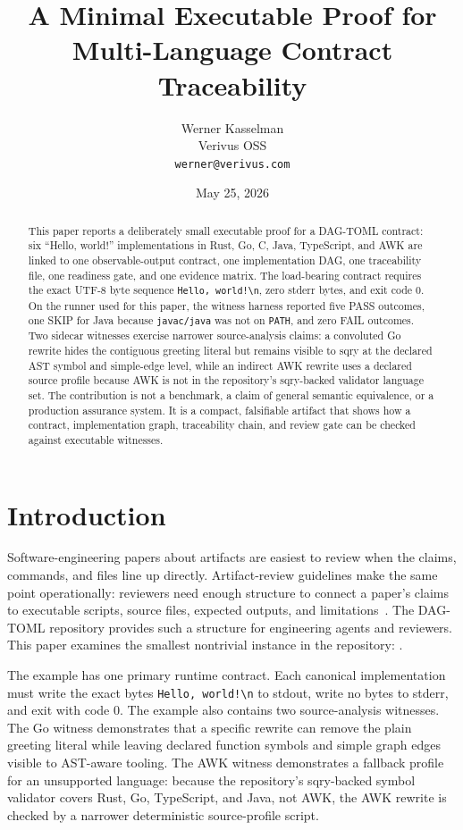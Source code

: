 \documentclass[11pt,letterpaper]{article}
\title{\bfseries A Minimal Executable Proof for Multi-Language Contract Traceability}
\author{Werner Kasselman\\Verivus OSS\\\texttt{werner@verivus.com}}
\date{May 25, 2026}
\newcommand{\dagtoml}{DAG-TOML}
\newcommand{\hellobytes}{\texttt{Hello, world!\textbackslash n}}
\begin{document}
\maketitle

\begin{abstract}
This paper reports a deliberately small executable proof for a
\dagtoml{} contract: six ``Hello, world!'' implementations in Rust, Go,
C, Java, TypeScript, and AWK are linked to one observable-output
contract, one implementation DAG, one traceability file, one readiness
gate, and one evidence matrix. The load-bearing contract requires the
exact UTF-8 byte sequence \hellobytes{}, zero stderr bytes, and exit
code 0. On the runner used for this paper, the witness harness reported
five PASS outcomes, one SKIP for Java because \texttt{javac/java} was
not on \texttt{PATH}, and zero FAIL outcomes. Two sidecar witnesses
exercise narrower source-analysis claims: a convoluted Go rewrite hides
the contiguous greeting literal but remains visible to sqry at the
declared AST symbol and simple-edge level, while an indirect AWK
rewrite uses a declared source profile because AWK is not in the
repository's sqry-backed validator language set. The contribution is
not a benchmark, a claim of general semantic equivalence, or a
production assurance system. It is a compact, falsifiable artifact that
shows how a contract, implementation graph, traceability chain, and
review gate can be checked against executable witnesses.
\end{abstract}

\section{Introduction}

Software-engineering papers about artifacts are easiest to review when
the claims, commands, and files line up directly. Artifact-review
guidelines make the same point operationally: reviewers need enough
structure to connect a paper's claims to executable scripts, source
files, expected outputs, and limitations~\cite{acmBadging2020,poplArtifact2023}.
The \dagtoml{} repository provides such a structure for engineering
agents and reviewers. This paper examines the smallest nontrivial
instance in the repository: .

The example has one primary runtime contract. Each canonical
implementation must write the exact bytes \hellobytes{} to stdout,
write no bytes to stderr, and exit with code 0. The example also
contains two source-analysis witnesses. The Go witness demonstrates
that a specific rewrite can remove the plain greeting literal while
leaving declared function symbols and simple graph edges visible to
AST-aware tooling. The AWK witness demonstrates a fallback profile for
an unsupported language: because the repository's sqry-backed symbol
validator covers Rust, Go, TypeScript, and Java, not AWK, the AWK
rewrite is checked by a narrower deterministic source-profile script.
\end{document}
